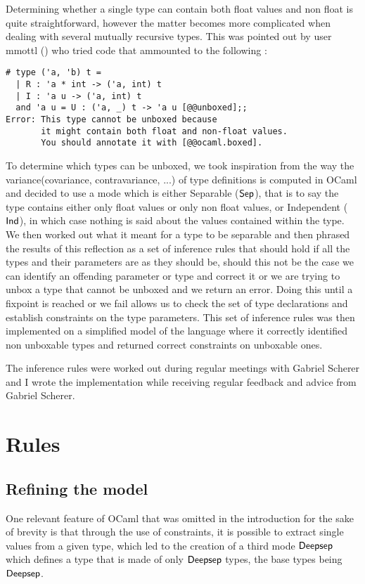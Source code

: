 \documentclass[a4]{article}
\begin{document}
Determining whether a single type can contain both float values and non float is quite straightforward, however the matter becomes more complicated when dealing with several mutually recursive types. This was pointed out by user mmottl () who tried code that ammounted to the following :

\begin{lstlisting}
# type ('a, 'b) t =
  | R : 'a * int -> ('a, int) t
  | I : 'a u -> ('a, int) t
  and 'a u = U : ('a, _) t -> 'a u [@@unboxed];;
Error: This type cannot be unboxed because
       it might contain both float and non-float values.
       You should annotate it with [@@ocaml.boxed].
\end{lstlisting}

To determine which types can be unboxed, we took inspiration from the way the variance(covariance, contravariance, ...) of type definitions is computed in OCaml and decided to use a mode which is either Separable ($\mathsf{Sep}$), that is to say the type contains either only float values or only non float values, or {Independent} ($\mathsf{Ind}$), in which case nothing is said about the values contained within the type. We then worked out what it meant for a type to be separable and then phrased the results of this reflection as a set of inference rules that should hold if all the types and their parameters are as they should be, should this not be the case we can identify an offending parameter or type and correct it or we are trying to unbox a type that cannot be unboxed and we return an error. Doing this until a fixpoint is reached or we fail allows us to check the set of type declarations and establish constraints on the type parameters. This set of inference rules was then implemented on a simplified model of the language where it correctly identified non unboxable types and returned correct constraints on unboxable ones.

The inference rules were worked out during regular meetings with Gabriel Scherer and I wrote the implementation while receiving regular feedback and advice from Gabriel Scherer.

\section{Rules}

\subsection{Refining the model}
One relevant feature of OCaml that was omitted in the introduction for the sake of brevity is that through the use of constraints, it is possible to extract single values from a given type, which led to the creation of a third mode $\mathsf{Deepsep}$ which defines a type that is made of only $\mathsf{Deepsep}$ types, the base types being $\mathsf{Deepsep}$.
\end{document}

